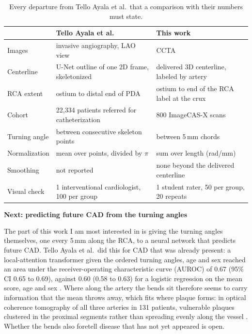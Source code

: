 \begin{table}[H]
  \centering
  \small
  \begin{tabular}{@{}p{2.3cm}p{6.3cm}p{6.3cm}@{}}
    \toprule
    & Tello Ayala et al.\ \cite{tello2026tortuosity} & This work \\
    \midrule
    Images & invasive angiography, LAO view & CCTA \\
    Centerline & U-Net outline of one 2D frame, skeletonized & delivered 3D centerline, labeled by artery \\
    RCA extent & ostium to distal end of PDA & ostium to end of the RCA label at the crux \\
    Cohort & 22,334 patients referred for catheterization & 800 ImageCAS-X scans \\
    Turning angle & between consecutive skeleton points & between 5\,mm chords \\
    Normalization & mean over points, divided by $\pi$ & sum over length (rad/mm) \\
    Smoothing & not reported & none beyond the delivered centerline \\
    Visual check & 1 interventional cardiologist, 100 per group & 1 student rater, 50 per group, 20 repeats \\
    \bottomrule
  \end{tabular}
  \caption{Every departure from Tello Ayala et al.\ that a comparison with their numbers must state.}
  \label{tab:deviations}
\end{table}

\medskip
\noindent \textbf{Next: predicting future CAD from the turning angles}

\noindent The part of this work I am most interested in is giving the turning angles themselves,
one every 5\,mm along the RCA, to a neural network that predicts future CAD.
Tello Ayala et al.\ did this for CAD that was already present: a local-attention transformer given
the ordered turning angles, age and sex reached an area under the receiver-operating characteristic
curve (AUROC) of 0.67 (95\% CI 0.65 to 0.69), against 0.60 (0.58 to 0.63) for a logistic regression
on the mean score, age and sex \cite{tello2026tortuosity}.
Where along the artery the bends sit therefore seems to carry information that the mean throws away,
which fits where plaque forms: in optical coherence tomography of all three arteries in 131
patients, vulnerable plaques clustered in the proximal segments rather than spreading evenly along
the vessel \cite{araki2020plaques}.
Whether the bends also foretell disease that has not yet appeared is open.

